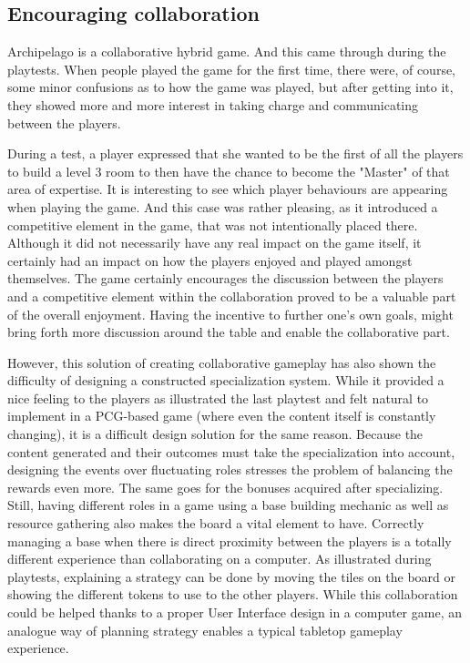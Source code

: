 \subsection{Encouraging collaboration} 
Archipelago is a collaborative hybrid game. And this came through during the playtests. When people played the game for the first time, there were, of course, some minor confusions as to how the game was played, but after getting into it, they showed more and more interest in taking charge and communicating between the players. 

During a test, a player expressed that she wanted to be the first of all the players to build a level 3 room to then have the chance to become the "Master" of that area of expertise. It is interesting to see which player behaviours are appearing when playing the game. And this case was rather pleasing, as it introduced a competitive element in the game, that was not intentionally placed there. Although it did not necessarily have any real impact on the game itself, it certainly had an impact on how the players enjoyed and played amongst themselves. The game certainly encourages the discussion between the players and a competitive element within the collaboration proved to be a valuable part of the overall enjoyment. Having the incentive to further one's own goals, might bring forth more discussion around the table and enable the collaborative part.

However, this solution of creating collaborative gameplay has also shown the difficulty of designing a constructed specialization system. While it provided a nice feeling to the players as illustrated the last playtest and felt natural to implement in a PCG-based game (where even the content itself is constantly changing), it is a difficult design solution for the same reason. Because the content generated and their outcomes must take the specialization into account, designing the events over fluctuating roles stresses the problem of balancing the rewards even more. The same goes for the bonuses acquired after specializing. Still, having different roles in a game using a base building mechanic as well as resource gathering also makes the board a vital element to have. Correctly managing a base when there is direct proximity between the players is a totally different experience than collaborating on a computer. As illustrated during playtests, explaining a strategy can be done by moving the tiles on the board or showing the different tokens to use to the other players. While this collaboration could be helped thanks to a proper User Interface design in a computer game, an analogue way of planning strategy enables a typical tabletop gameplay experience.

